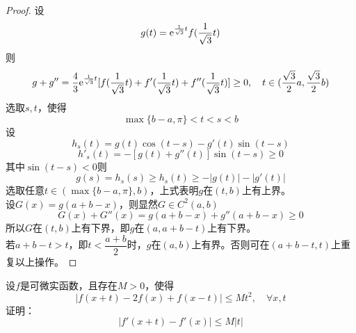 \begin{proof}

    设
    $$g(t) = \mathrm{e}^{\frac{1}{\sqrt{3}}t}f(\frac{1}{\sqrt{3}}t)$$
    则
    $$g + g'' = \dfrac{4}{3}\mathrm{e}^{\frac{1}{\sqrt{3}}t}[f(\frac{1}{\sqrt{3}}t) + f'(\frac{1}{\sqrt{3}}t) + f''(\frac{1}{\sqrt{3}}t)] \geq 0, \quad t \in(\dfrac{\sqrt{3}}{2}a, \dfrac{\sqrt{3}}{2}b)$$
    选取$s,t$，使得
    $$\max\{b-a, \pi\} < t < s < b$$
    设
    $$h_s(t) = g(t) \cos(t-s) - g'(t)\sin(t-s)$$
    $$h'_s(t) = -[g(t) + g''(t)] \sin(t-s) \geq 0$$
    其中$\sin(t-s) < 0$则
    $$g(s) = h_s(s) \geq h_s(t) \geq -|g(t)| - |g'(t)|$$
    选取任意$t \in (\max\{b-a,\pi\},b)$，上式表明$g$在$(t,b)$上有上界。\\
    设$G(x) = g(a + b -x)$，则显然$G \in C^2(a,b)$
    $$G(x) + G''(x) = g(a+b-x) + g''(a+b-x) \geq 0$$
    所以$G$在$(t,b)$上有下界，即$g$在$(a, a+b-t)$上有下界。\\
    若$a + b -t > t$，即$t < \dfrac{a+b}{2}$时，$g$在$(a,b)$上有界。否则可在$(a+b -t ,t)$上重复以上操作。

\end{proof}

\begin{proposition}

    设$f$是可微实函数，且存在$M > 0$，使得
    $$|f(x+t) - 2f(x) + f(x-t)| \leq Mt^2, \quad \forall x,t$$
    证明：
    $$|f'(x+t) - f'(x)| \leq M|t|$$

\end{proposition}

